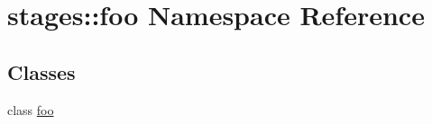 \hypertarget{namespacestages_1_1foo}{\section{stages\-:\-:foo \-Namespace \-Reference}
\label{namespacestages_1_1foo}
}
\subsection*{\-Classes}
\begin{DoxyCompactItemize}
\item 
class \hyperlink{classstages_1_1foo_1_1foo}{foo}
\end{DoxyCompactItemize}
